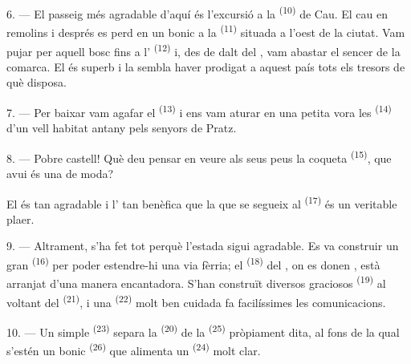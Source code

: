 \VUsaut{3.0mm}
\VUsaut{3.0mm}

6. --- El passeig més agradable d'aquí és l'excursió a la 
\textsuperscript{(10)} de Cau. El  cau en remolins i després
es perd en un bonic  a la 
\textsuperscript{(11)} situada a l'oest de la ciutat. Vam pujar per aquell bosc
fins a l' \textsuperscript{(12)} i, des de dalt
del , vam abastar el  sencer de la comarca. El
 és superb i la  sembla haver prodigat a aquest
país tots els tresors de què disposa.

7. --- Per baixar vam agafar el  \textsuperscript{(13)} i ens vam
aturar en una petita  vora les 
\textsuperscript{(14)} d'un vell  habitat antany pels
senyors de Pratz.

8. --- Pobre castell! Què deu pensar en veure als seus peus la coqueta
 \textsuperscript{(15)}, que avui és una  de moda?

El  és tan agradable i l' tan benèfica que la
 que se segueix al  \textsuperscript{(17)} és un
veritable plaer.

\VUsaut{3.0mm}
\VUsaut{3.0mm}

9. --- Altrament, s'ha fet tot perquè l'estada sigui agradable. Es va construir un
gran  \textsuperscript{(16)} per poder estendre-hi una via fèrria;
el  \textsuperscript{(18)} del , on es donen
, està arranjat d'una manera encantadora. S'han construït
diversos graciosos  \textsuperscript{(19)} al voltant del
 \textsuperscript{(21)}, i una 
\textsuperscript{(22)} molt ben cuidada fa facilíssimes les comunicacions.

10. --- Un simple  \textsuperscript{(23)} separa la 
\textsuperscript{(20)} de la  \textsuperscript{(25)} pròpiament dita,
al fons de la qual s'estén un bonic  \textsuperscript{(26)} que
alimenta un  \textsuperscript{(24)} molt clar.


